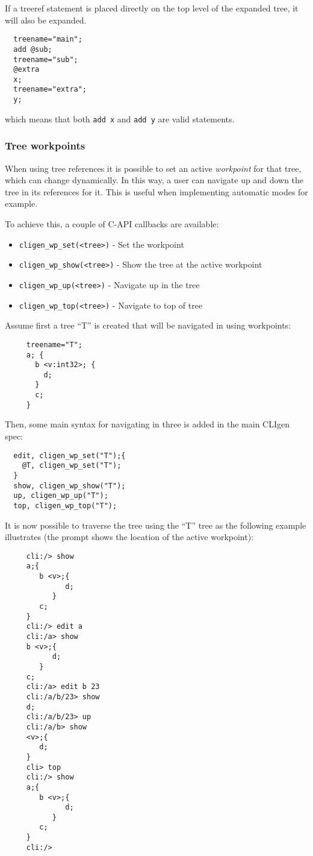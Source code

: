 \documentclass[a4paper, 10pt] {article}
\begin{document}
If a treeref statement is placed directly on the top level of the
expanded tree, it will also be expanded.
\begin{verbatim}
  treename="main";
  add @sub;
  treename="sub";
  @extra
  x;
  treename="extra";
  y;  
\end{verbatim}

which means that both {\tt add x} and {\tt add y} are valid statements.

\subsubsection{Tree workpoints}

When using tree references it is possible to set an active {\em
  workpoint} for that tree, which can change dynamically. In this way,
a user can navigate up and down the tree in its references for it. This
is useful when implementing automatic modes for example.

To achieve this, a couple of C-API callbacks are available:
\begin{itemize}
  \item {\tt cligen\_wp\_set(<tree>)} - Set the workpoint
  \item {\tt cligen\_wp\_show(<tree>)} - Show the tree at the active workpoint
  \item {\tt cligen\_wp\_up(<tree>)} - Navigate up in the tree
  \item {\tt cligen\_wp\_top(<tree>)} - Navigate to top of tree
\end{itemize}

Assume first a tree ``T'' is created that will be navigated in using workpoints:
\begin{verbatim}
     treename="T";
     a; {
       b <v:int32>; {
         d;
       }
       c;
     }
\end{verbatim}

Then, some main syntax for navigating in three is added in the main CLIgen spec:

\begin{verbatim}
  edit, cligen_wp_set("T");{
    @T, cligen_wp_set("T");
  }
  show, cligen_wp_show("T");
  up, cligen_wp_up("T");
  top, cligen_wp_top("T");
\end{verbatim}

It is now possible to traverse the tree using the ``T'' tree as the following example illustrates (the prompt shows the location of the active workpoint):
\begin{verbatim}
     cli:/> show 
     a;{
        b <v>;{
              d;
           }
        c;
     }
     cli:/> edit a 
     cli:/a> show 
     b <v>;{
           d;
        }
     c;
     cli:/a> edit b 23
     cli:/a/b/23> show 
     d;
     cli:/a/b/23> up
     cli:/a/b> show 
     <v>;{
        d;
     }
     cli> top
     cli:/> show 
     a;{
        b <v>;{
              d;
           }
        c;
     }
     cli:/> 
\end{verbatim}
\end{document}
